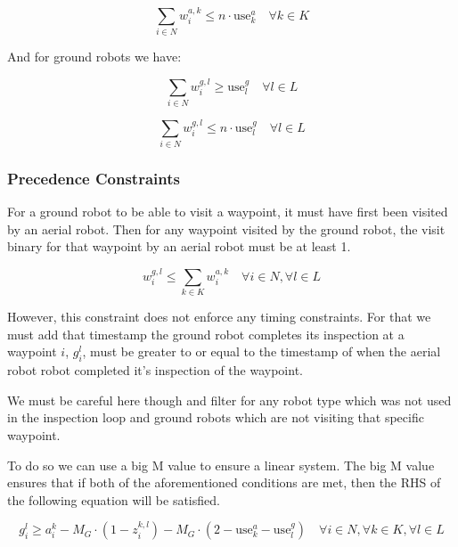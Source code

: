 \documentclass{article}
\begin{document}
				\begin{equation}
				\sum_{i \in N} w_i^{a,k} \leq n \cdot \text{use}_k^a \quad \forall k \in K
				\end{equation}

				And for ground robots we have:

				\begin{equation}
				\sum_{i \in N} w_i^{g,l} \geq \text{use}_l^g \quad \forall l \in L
				\end{equation}

				\begin{equation}
				\sum_{i \in N} w_i^{g,l} \leq n \cdot \text{use}_l^g \quad \forall l \in L
				\end{equation}


			\subsubsection{Precedence Constraints}

				For a ground robot to be able to visit a waypoint, it must have first been visited by an aerial robot. 
				Then for any waypoint visited by the ground robot, the visit binary for that waypoint by an aerial robot must be at least 1.	

				\begin{equation}
					w_i^{g,l} \leq \sum_{k \in K} w_i^{a,k} \quad \forall i \in N, \forall l \in L
				\end{equation}


				However, this constraint does not enforce any timing constraints. For that we must add that timestamp the ground robot completes its inspection at a waypoint $i$, $g_i^l$, must be greater to or equal to the timestamp of when the aerial robot robot completed it's inspection of the waypoint.
				
				We must be careful here though and filter for any robot type which was not used in the inspection loop and ground robots which are not visiting that specific waypoint. 

				To do so we can use a big M value to ensure a linear system. The big M value ensures that if both of the aforementioned conditions are met, then the RHS of the following equation will be satisfied.

				\begin{equation}
					g_i^l \geq a_i^k - M_G \cdot (1 - z_i^{k,l}) - M_G \cdot (2 - \text{use}_k^a - \text{use}_l^g) \quad \forall i \in N, \forall k \in K, \forall l \in L
				\end{equation}
\end{document}
